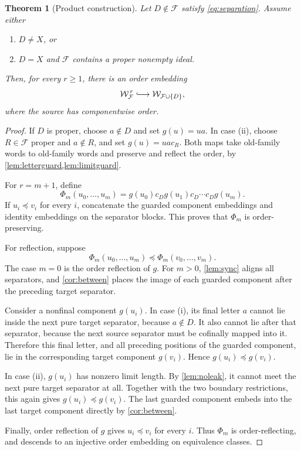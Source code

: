 \documentclass[11pt]{article}
\numberwithin{equation}{section}
\newtheorem{theorem}{Theorem}[section]
\theoremstyle{plain}
\theoremstyle{definition}
\theoremstyle{remark}
\newcommand{\F}{\mathcal F}
\newcommand{\W}{\mathcal W}
\newcommand{\sub}{\preccurlyeq}
\begin{document}
\begin{theorem}[Product construction]\label{thm:product}
Let $D\notin\F$ satisfy \eqref{eq:separation}. Assume either
\begin{enumerate}[label=(\roman*)]
 \item $D\neq X$, or
 \item $D=X$ and $\F$ contains a proper nonempty ideal.
\end{enumerate}
Then, for every $r\geq1$, there is an order embedding
\begin{equation}\label{eq:productembedding}
 \W_{\F}^{\,r}\lhook\joinrel\longrightarrow\W_{\F\cup\{D\}},
\end{equation}
where the source has componentwise order.
\end{theorem}
\begin{proof}
If $D$ is proper, choose $a\notin D$ and set $g(u)=ua$. In case (ii), choose $R\in\F$ proper and $a\notin R$, and set $g(u)=uac_R$. Both maps take old-family words to old-family words and preserve and reflect the order, by \cref{lem:letterguard,lem:limitguard}.

For $r=m+1$, define
\begin{equation}\label{eq:Phi}
 \Phi_m(u_0,\ldots,u_m)
  =g(u_0)c_D g(u_1)c_D\cdots c_D g(u_m).
\end{equation}
If $u_i\sub v_i$ for every $i$, concatenate the guarded component embeddings and identity embeddings on the separator blocks. This proves that $\Phi_m$ is order-preserving.

For reflection, suppose
\[
 \Phi_m(u_0,\ldots,u_m)\sub\Phi_m(v_0,\ldots,v_m).
\]
The case $m=0$ is the order reflection of $g$. For $m>0$, \cref{lem:sync} aligns all separators, and \cref{cor:between} places the image of each guarded component after the preceding target separator.

Consider a nonfinal component $g(u_i)$. In case (i), its final letter $a$ cannot lie inside the next pure target separator, because $a\notin D$. It also cannot lie after that separator, because the next source separator must be cofinally mapped into it. Therefore this final letter, and all preceding positions of the guarded component, lie in the corresponding target component $g(v_i)$. Hence $g(u_i)\sub g(v_i)$.

In case (ii), $g(u_i)$ has nonzero limit length. By \cref{lem:noleak}, it cannot meet the next pure target separator at all. Together with the two boundary restrictions, this again gives $g(u_i)\sub g(v_i)$. The last guarded component embeds into the last target component directly by \cref{cor:between}.

Finally, order reflection of $g$ gives $u_i\sub v_i$ for every $i$. Thus $\Phi_m$ is order-reflecting, and descends to an injective order embedding on equivalence classes.
\end{proof}
\end{document}
